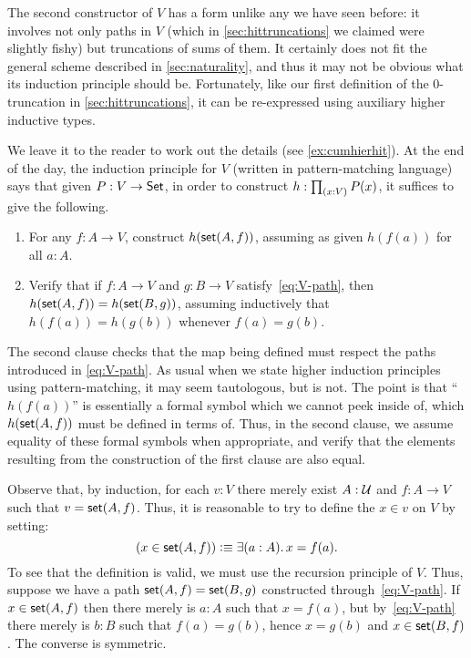 The second constructor of $V$ has a form unlike any we have seen before: it involves not only paths in $V$ (which in \autoref{sec:hittruncations} we claimed were slightly fishy) but truncations of sums of them.
It certainly does not fit the general scheme described in \autoref{sec:naturality}, and thus it may not be obvious what its induction principle should be.
Fortunately, like our first definition of the 0-truncation in \autoref{sec:hittruncations}, it can be re-expressed using auxiliary higher inductive types.

We leave it to the reader to work out the details (see \autoref{ex:cumhierhit}).
At the end of the day, the induction principle for $V$ (written in pattern-matching language) says that given $P:V\to \mathsf{Set}$, in order to construct $h:\prd{x:V} P(x)$, it suffices to give the following.
\begin{enumerate}
\item For any $f:A\to V$, construct $h(\mathsf{set}(A,f))$, assuming as given $h(f(a))$ for all $a:A$.
\item Verify that if $f : A \to V$ and $g : B \to V$ satisfy~\eqref{eq:V-path}, then $h(\mathsf{set}(A,f)) = h(\mathsf{set}(B,g))$, assuming inductively that $h(f(a)) = h(g(b))$ whenever $f(a)=g(b)$.
\end{enumerate}
The second clause checks that the map being defined must respect the paths introduced in \eqref{eq:V-path}.
As usual when we state higher induction principles using pattern-matching, it may seem tautologous, but is not.
The point is that ``$h(f(a))$'' is essentially a formal symbol which we cannot peek inside of, which $h(\mathsf{set}(A,f))$ must be defined in terms of. Thus, in the second clause, we assume equality of these formal symbols when appropriate, and verify that the elements resulting from the construction of the first clause are also equal.  

Observe that, by induction, for each $v:V$ there merely exist $A:\mathcal{U}$ and $f:A\to V$ such that $v=\mathsf{set}(A,f)$.
Thus, it is reasonable to try to define the  $x\in v$ on $V$ by setting:
%
%
\begin{equation*}
  (x \in \vset(A,f)) \defeq \exis{a : A} x = f(a).
\end{equation*}
%
To see that the definition is valid, we must use the recursion principle of $V$.  Thus, suppose we have a path $\mathsf{set}(A, f) = \mathsf{set}(B, g)$
constructed through~\eqref{eq:V-path}. If $x \in \mathsf{set}(A,f)$ then there merely is $a : A$ such
that $x = f(a)$, but by~\eqref{eq:V-path} there merely is $b : B$ such that $f(a) = g(b)$, hence
$x = g(b)$ and $x \in \mathsf{set}(B,f)$. The converse is symmetric.

